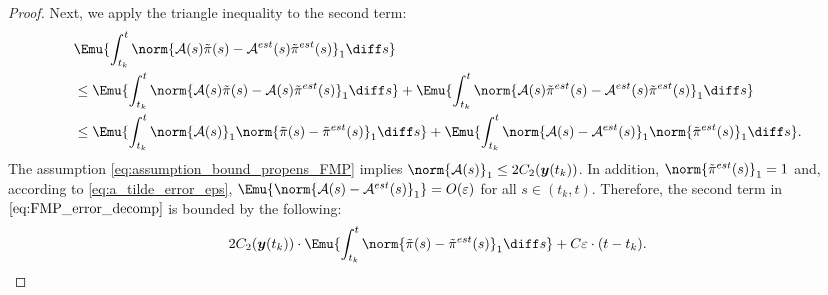 \begin{proof}
Next, we apply the triangle inequality to the second term:
\begin{align*}
    &\Emu{ \int_{t_k}^{t} \norm{\mathcal{A}(s) \Tilde{\pi}(s) - \mathcal{A}^{est}(s) \Tilde{\pi}^{est}(s) }_1 \diff s } \\
    &\leq \Emu{ \int_{t_k}^{t} \norm{\mathcal{A}(s) \Tilde{\pi}(s) - \mathcal{A}(s) \Tilde{\pi}^{est}(s) }_1 \diff s } + \Emu{ \int_{t_k}^{t} \norm{\mathcal{A}(s) \Tilde{\pi}^{est}(s) - \mathcal{A}^{est}(s) \Tilde{\pi}^{est}(s) }_1 \diff s } \\
    &\leq \Emu{ \int_{t_k}^{t} \norm{ \mathcal{A}(s) }_1 \norm{ \Tilde{\pi}(s) -  \Tilde{\pi}^{est}(s) }_1 \diff s } + \Emu{ \int_{t_k}^{t} \norm{ \mathcal{A}(s) - \mathcal{A}^{est}(s) }_1 \norm{ \Tilde{\pi}^{est}(s) }_1 \diff s }.
\end{align*}
The assumption \eqref{eq:assumption_bound_propens_FMP} implies $\norm{\mathcal{A}(s)}_1 \leq 2 C_2(\boldsymbol{y}(t_k))$. In addition, $\norm{\Tilde{\pi}^{est}(s)}_1 = 1$ and, according to \eqref{eq:a_tilde_error_eps}, $\Emu{\norm{\mathcal{A}(s) - \mathcal{A}^{est}(s)}_1} = O(\varepsilon)$ for all $s \in (t_k, t)$. Therefore, the second term in $\eqref{eq:FMP_error_decomp}$ is bounded by the following:
\begin{align*}
    2 C_2(\boldsymbol{y}(t_k)) \cdot \Emu{ \int_{t_k}^{t} \norm{ \Tilde{\pi}(s) -  \Tilde{\pi}^{est}(s) }_1 \diff s } + C \varepsilon \cdot (t-t_k).
\end{align*}


\end{proof}
